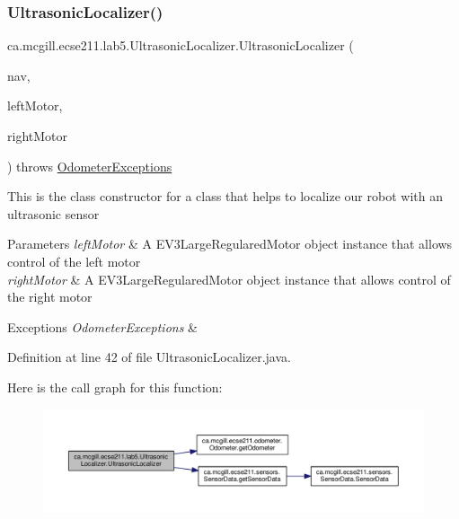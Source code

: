 \subsubsection{\texorpdfstring{Ultrasonic\+Localizer()}{UltrasonicLocalizer()}}
{\footnotesize\ttfamily ca.\+mcgill.\+ecse211.\+lab5.\+Ultrasonic\+Localizer.\+Ultrasonic\+Localizer (\begin{DoxyParamCaption}\item[{\hyperlink{classca_1_1mcgill_1_1ecse211_1_1lab5_1_1_navigation}{Navigation}}]{nav,  }\item[{E\+V3\+Large\+Regulated\+Motor}]{left\+Motor,  }\item[{E\+V3\+Large\+Regulated\+Motor}]{right\+Motor }\end{DoxyParamCaption}) throws \hyperlink{classca_1_1mcgill_1_1ecse211_1_1odometer_1_1_odometer_exceptions}{Odometer\+Exceptions}}

This is the class constructor for a class that helps to localize our robot with an ultrasonic sensor


\begin{DoxyParams}{Parameters}
{\em left\+Motor} & A E\+V3\+Large\+Regulared\+Motor object instance that allows control of the left motor \\
\hline
{\em right\+Motor} & A E\+V3\+Large\+Regulared\+Motor object instance that allows control of the right motor \\
\hline
\end{DoxyParams}

\begin{DoxyExceptions}{Exceptions}
{\em Odometer\+Exceptions} & \\
\hline
\end{DoxyExceptions}


Definition at line 42 of file Ultrasonic\+Localizer.\+java.

Here is the call graph for this function\+:\nopagebreak
\begin{figure}[H]
\begin{center}
\leavevmode
\includegraphics[width=350pt]{classca_1_1mcgill_1_1ecse211_1_1lab5_1_1_ultrasonic_localizer_a47c08f2d2ec2ba664867231ca62020da_cgraph}
\end{center}
\end{figure}


